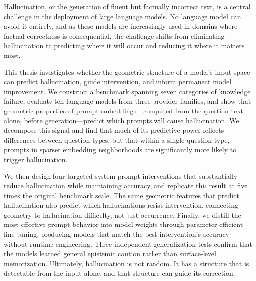 
Hallucination, or the generation of fluent but factually incorrect text, is a central challenge in the deployment of large language models. No language model can avoid it entirely, and as these models are increasingly used in domains where factual correctness is consequential, the challenge shifts from eliminating hallucination to predicting where it will occur and reducing it where it matters most.

This thesis investigates whether the geometric structure of a model's input space can predict hallucination, guide intervention, and inform permanent model improvement. We construct a benchmark spanning seven categories of knowledge failure, evaluate ten language models from three provider families, and show that geometric properties of prompt embeddings---computed from the question text alone, before generation---predict which prompts will cause hallucination. We decompose this signal and find that much of its predictive power reflects differences between question types, but that within a single question type, prompts in sparser embedding neighborhoods are significantly more likely to trigger hallucination.

We then design four targeted system-prompt interventions that substantially reduce hallucination while maintaining accuracy, and replicate this result at five times the original benchmark scale. The same geometric features that predict hallucination also predict which hallucinations resist intervention, connecting geometry to hallucination difficulty, not just occurrence. Finally, we distill the most effective prompt behavior into model weights through parameter-efficient fine-tuning, producing models that match the best intervention's accuracy without runtime engineering. Three independent generalization tests confirm that the models learned general epistemic caution rather than surface-level memorization. Ultimately, hallucination is not random. It has a structure that is detectable from the input alone, and that structure can guide its correction.